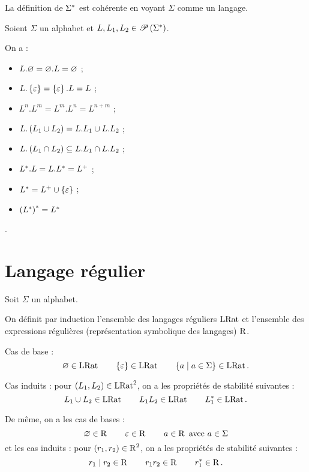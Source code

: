 \begin{rem}
La définition de \(\Sigma^{*}\) est cohérente en voyant \(\Sigma\) comme un langage.
\end{rem}

\begin{prop}
Soient \(\Sigma\) un alphabet et \(L,L_1,L_2\in\mathscr{P}\left(\Sigma^{*}\right)\).

On a :

\begin{itemize}
    \item \(L.\varnothing=\varnothing.L=\varnothing\) ; \\
    \item \(L.\left\lbrace\varepsilon\right\rbrace=\left\lbrace\varepsilon\right\rbrace.L=L\) ; \\
    \item \(L^n.L^m=L^m.L^n=L^{n+m}\) ; \\
    \item \(L.\left(L_1\cup L_2\right)=L.L_1\cup L.L_2\) ; \\
    \item \(L.\left(L_1\cap L_2\right)\subseteq L.L_1\cap L.L_2\) ; \\
    \item \(L^{*}.L=L.L^{*}=L^+\) ; \\
    \item \(L^{*}=L^+\cup\left\lbrace\varepsilon\right\rbrace\) ; \\
    \item \(\left(L^{*}\right)^{*}=L^{*}\)
\end{itemize}
\end{prop}

\begin{dem}
\Cf {}.
\end{dem}

\section{Langage régulier}

Soit \(\Sigma\) un alphabet.

\begin{defi}
On définit par induction l'ensemble des langages réguliers \(\operatorname{LRat}\) et l'ensemble des expressions régulières (représentation symbolique des langages) \(\operatorname{R}\).

Cas de base : \[\varnothing\in\operatorname{LRat}\qquad\left\lbrace\varepsilon\right\rbrace\in\operatorname{LRat}\qquad\left\lbrace a\;\middle|\; a\in\Sigma\right\rbrace\in\operatorname{LRat}.\]

Cas induits : pour \(\left(L_1,L_2\right)\in\operatorname{LRat}^2\), on a les propriétés de stabilité suivantes : \[L_1\cup L_2\in\operatorname{LRat}\qquad L_1L_2\in\operatorname{LRat}\qquad L_1^{*}\in\operatorname{LRat}.\]

De même, on a les cas de bases : \[\varnothing\in\operatorname{R}\qquad\varepsilon\in\operatorname{R}\qquad a\in\operatorname{R}\text{ avec }a\in\Sigma\] et les cas induits : pour \(\left(r_1,r_2\right)\in\operatorname{R}^2\), on a les propriétés de stabilité suivantes : \[r_1\mid r_2\in\operatorname{R}\qquad r_1r_2\in\operatorname{R}\qquad r_1^{*}\in\operatorname{R}.\]
\end{defi}

